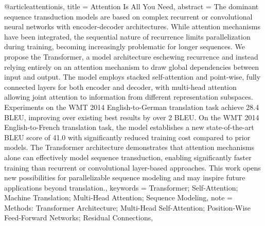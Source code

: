 @article{attentionis,
  title = {Attention Is All You Need},
  abstract = {The dominant sequence transduction models are based on complex recurrent or convolutional neural networks with encoder-decoder architectures. While attention mechanisms have been integrated, the sequential nature of recurrence limits parallelization during training, becoming increasingly problematic for longer sequences. We propose the Transformer, a model architecture eschewing recurrence and instead relying entirely on an attention mechanism to draw global dependencies between input and output. The model employs stacked self-attention and point-wise, fully connected layers for both encoder and decoder, with multi-head attention allowing joint attention to information from different representation subspaces. Experiments on the WMT 2014 English-to-German translation task achieve 28.4 BLEU, improving over existing best results by over 2 BLEU. On the WMT 2014 English-to-French translation task, the model establishes a new state-of-the-art BLEU score of 41.0 with significantly reduced training cost compared to prior models. The Transformer architecture demonstrates that attention mechanisms alone can effectively model sequence transduction, enabling significantly faster training than recurrent or convolutional layer-based approaches. This work opens new possibilities for parallelizable sequence modeling and may inspire future applications beyond translation.},
  keywords = {Transformer; Self-Attention; Machine Translation; Multi-Head Attention; Sequence Modeling},
  note = {Methods: Transformer Architecture; Multi-Head Self-Attention; Position-Wise Feed-Forward Networks; Residual Connections},
}
